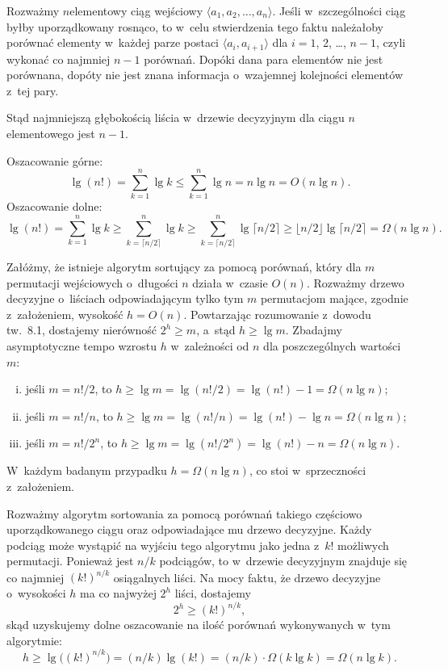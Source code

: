 
\exercise %
Rozważmy $n$\nbhyphen elementowy ciąg wejściowy $\langle a_1,a_2,\dots,a_n\rangle$.
Jeśli w~szczególności ciąg byłby uporządkowany rosnąco, to w~celu stwierdzenia tego faktu należałoby porównać elementy w~każdej parze postaci $\langle a_i,a_{i+1}\rangle$ dla $i=1$, 2, \dots, $n-1$, czyli wykonać co najmniej $n-1$ porównań.
Dopóki dana para elementów nie jest porównana, dopóty nie jest znana informacja o~wzajemnej kolejności elementów z~tej pary.

Stąd najmniejszą głębokością liścia w~drzewie decyzyjnym dla ciągu $n$\nbhyphen elementowego jest $n-1$.

\exercise %
Oszacowanie górne:
\[
	\lg(n!) = \sum_{k=1}^n\lg k \le \sum_{k=1}^n\lg n = n\lg n = O(n\lg n).
\]
Oszacowanie dolne:
\[
	\lg(n!) = \sum_{k=1}^n\lg k \ge \sum_{k=\lceil n/2\rceil}^n\lg k \ge \sum_{k=\lceil n/2\rceil}^n\lg\lceil n/2\rceil \ge \lfloor n/2\rfloor\lg\lceil n/2\rceil = \Omega(n\lg n).
\]

\exercise %
Załóżmy, że istnieje algorytm sortujący za pomocą porównań, który dla $m$ permutacji wejściowych o~długości $n$ działa w~czasie $O(n)$.
Rozważmy drzewo decyzyjne o~liściach odpowiadającym tylko tym $m$ permutacjom mające, zgodnie z~założeniem, wysokość $h=O(n)$.
Powtarzając rozumowanie z~dowodu tw.\ 8.1, dostajemy nierówność $2^h\ge m$, a~stąd $h\ge\lg m$.
Zbadajmy asymptotyczne tempo wzrostu $h$ w~zależności od $n$ dla poszczególnych wartości $m$:
\begin{enumerate}[(i)]
	\item jeśli $m=n!/2$, to $h\ge\lg m=\lg(n!/2)=\lg(n!)-1=\Omega(n\lg n)$;
	\item jeśli $m=n!/n$, to $h\ge\lg m=\lg(n!/n)=\lg(n!)-\lg n=\Omega(n\lg n)$;
	\item jeśli $m=n!/2^n$, to $h\ge\lg m=\lg(n!/2^n)=\lg(n!)-n=\Omega(n\lg n)$.
\end{enumerate}
W~każdym badanym przypadku $h=\Omega(n\lg n)$, co stoi w~sprzeczności z~założeniem.

\exercise %
Rozważmy algorytm sortowania za pomocą porównań takiego częściowo uporządkowanego ciągu oraz odpowiadające mu drzewo decyzyjne.
Każdy podciąg może wystąpić na wyjściu tego algorytmu jako jedna z~$k!$ możliwych permutacji.
Ponieważ jest $n/k$ podciągów, to w~drzewie decyzyjnym znajduje się co najmniej $(k!)^{n/k}$ osiągalnych liści.
Na mocy faktu, że drzewo decyzyjne o~wysokości $h$ ma co najwyżej $2^h$ liści, dostajemy
\[
	2^h \ge (k!)^{n/k},
\]
skąd uzyskujemy dolne oszacowanie na ilość porównań wykonywanych w~tym algorytmie:
\[
	h \ge \lg\bigl((k!)^{n/k}\bigr) = (n/k)\lg(k!) = (n/k)\cdot\Omega(k\lg k) = \Omega(n\lg k).
\]
